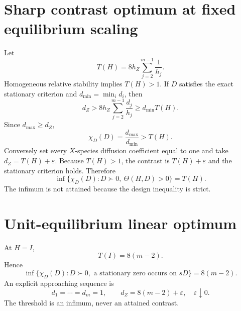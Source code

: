 \section*{Sharp contrast optimum at fixed equilibrium scaling}
Let
\[
T(H)=8h_Z\sum_{j=2}^{m-1}\frac1{h_j}.
\]
Homogeneous relative stability implies $T(H)>1$.  If $D$ satisfies the exact
stationary criterion and $d_{\min}=\min_i d_i$, then
\[
d_Z>8h_Z\sum_{j=2}^{m-1}\frac{d_j}{h_j}
\ge d_{\min}T(H).
\]
Since $d_{\max}\ge d_Z$,
\[
\chi_D(D)=\frac{d_{\max}}{d_{\min}}>T(H).
\]
Conversely set every $X$-species diffusion coefficient equal to one and take
$d_Z=T(H)+\varepsilon$.  Because $T(H)>1$, the contrast is
$T(H)+\varepsilon$ and the stationary criterion holds.  Therefore
\[
\boxed{\inf\{\chi_D(D):D\succ0,\ \Theta(H,D)>0\}=T(H).}
\]
The infimum is not attained because the design inequality is strict.


\section*{Unit-equilibrium linear optimum}
At $H=I$,
\[
T(I)=8(m-2).
\]
Hence
\[
\boxed{\inf\{\chi_D(D):D\succ0,\text{ a stationary zero occurs on }sD\}
=8(m-2).}
\]
An explicit approaching sequence is
\[
d_1=\cdots=d_m=1,
\qquad d_Z=8(m-2)+\varepsilon,
\quad \varepsilon\downarrow0.
\]
The threshold is an infimum, never an attained contrast.
